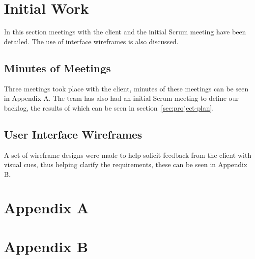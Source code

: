 \documentclass[11pt,a4paper]{article}
\begin{document}
\section{Initial Work}
\label{sec:initial-work}
In this section meetings with the client and the initial Scrum meeting have been detailed. The use of interface wireframes is also discussed.
\subsection{Minutes of Meetings}
Three meetings took place with the client, minutes of these meetings can be seen in Appendix A. The team has also had an initial Scrum meeting to define our backlog, the results of which can be seen in section~\ref{sec:project-plan}. 
\subsection{User Interface Wireframes}
A set of wireframe designs were made to help solicit feedback from the client with visual cues, thus helping clarify the requirements, these can be seen in Appendix B.

\section{Appendix A}

\lstset{basicstyle=\small, captionpos=b}









\section{Appendix B}
\end{document}
